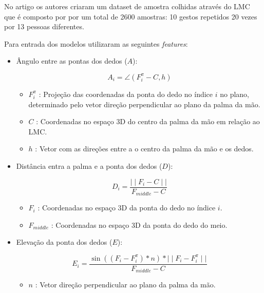 \documentclass{TTUPhD}
\begin{document}
No artigo \cite{handGestureReconWithLMC} os autores criaram um dataset de amostra colhidas através do LMC que é composto por
por um total de 2600 amostras: 10 gestos repetidos 20 vezes por 13 pessoas diferentes.

Para entrada dos modelos utilizaram as seguintes \textit{features}:

\begin{itemize}
    \item Ângulo entre as pontas dos dedos ($A$):

    \begin{equation}
        A_i = \angle(F_i^\pi - C, h)
    \end{equation}

    \begin{itemize}
        \item $F_i^\pi$ : Projeção das coordenadas da ponta do dedo no índice $i$ no plano, determinado pelo vetor direção perpendicular ao plano da palma da mão.
        \item $C$ : Coordenadas no espaço 3D do centro da palma da mão em relação ao LMC.
        \item $h$ : Vetor com as direções entre a o centro da palma da mão e os dedos.
    \end{itemize}

    \item Distância entra a palma e a ponta dos dedos ($D$):

    \begin{equation}
        D_i = \frac{\mid\mid F_i - C \mid\mid}{F_{middle} - C}
    \end{equation}

    \begin{itemize}
        \item $F_i$ : Coordenadas no espaço 3D da ponta do dedo no índice $i$.
        \item $F_{middle}$ : Coordenadas no espaço 3D da ponta do dedo do meio.
    \end{itemize}

    \item Elevação da ponta dos dedos ($E$):

    \begin{equation}
        E_i = \frac{\sin((F_i - F_i^\pi)*n)*\mid\mid F_i - F_i^\pi \mid\mid}{F_{middle} - C}
    \end{equation}

    \begin{itemize}
        \item $n$ : Vetor direção perpendicular ao plano da palma da mão.
    \end{itemize}


\end{itemize}
\end{document}
